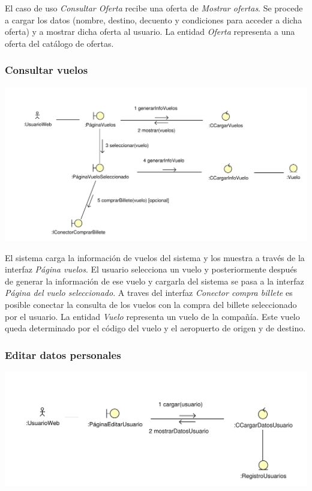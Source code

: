 \documentclass[11pt, a4paper, twoside, titlepage]{article}
\begin{document}
					El caso de uso {\itshape Consultar Oferta} recibe una oferta de {\itshape Mostrar ofertas}. Se procede a cargar los datos (nombre, destino, decuento y condiciones para acceder a dicha oferta) y a mostrar dicha oferta al usuario.
					La entidad {\itshape Oferta} representa a una oferta del catálogo de ofertas.

			\subsubsection{Consultar vuelos}
				\begin{center}
					\includegraphics[scale=.71]{analisis/diagramas/consultarvuelos.pdf}
				\end{center}
				El sistema carga la información de vuelos del sistema y los muestra a través de la interfaz {\itshape Página vuelos}. El usuario selecciona un vuelo y posteriormente después de generar la información de ese vuelo y cargarla del sistema se pasa a la interfaz {\itshape Página del vuelo seleccionado}. A traves del interfaz {\itshape Conector compra billete} es posible conectar la consulta de los vuelos con la compra del billete seleccionado por el usuario. 
				La entidad {\itshape Vuelo} representa un vuelo de la compañía. Este vuelo queda determinado por el código del vuelo y el aeropuerto de origen y de destino.
			
			\subsubsection{Editar datos personales}
				\begin{center}
					\includegraphics[scale=.86]{analisis/diagramas/editardatospersonales.pdf}
				\end{center}
\end{document}

